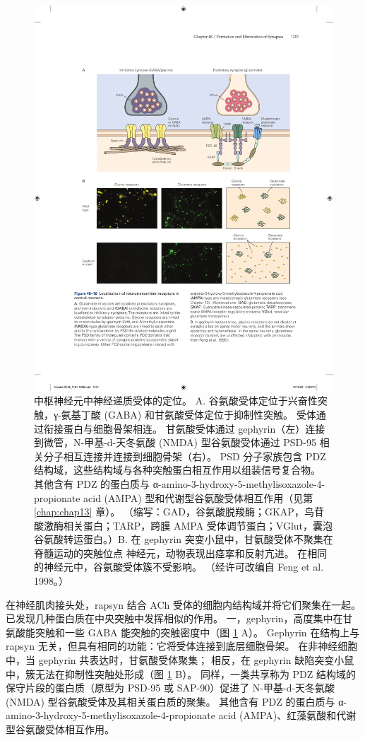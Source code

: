 \begin{figure}[htbp]
	\centering
	\includegraphics[width=0.8\linewidth]{chap48/fig_48_16}
	\caption{中枢神经元中神经递质受体的定位。 A. 谷氨酸受体定位于兴奋性突触，γ-氨基丁酸 (GABA) 和甘氨酸受体定位于抑制性突触。 受体通过衔接蛋白与细胞骨架相连。 甘氨酸受体通过 gephyrin（左）连接到微管，N-甲基-d-天冬氨酸 (NMDA) 型谷氨酸受体通过 PSD-95 相关分子相互连接并连接到细胞骨架（右）。 PSD 分子家族包含 PDZ 结构域，这些结构域与各种突触蛋白相互作用以组装信号复合物。 其他含有 PDZ 的蛋白质与 α-amino-3-hydroxy-5-methylisoxazole-4-propionate acid (AMPA) 型和代谢型谷氨酸受体相互作用（见第 \ref{chap:chap13} 章）。 （缩写：GAD，谷氨酸脱羧酶；GKAP，鸟苷酸激酶相关蛋白；TARP，跨膜 AMPA 受体调节蛋白；VGlut，囊泡谷氨酸转运蛋白。）B. 在 gephyrin 突变小鼠中，甘氨酸受体不聚集在脊髓运动的突触位点 神经元，动物表现出痉挛和反射亢进。 在相同的神经元中，谷氨酸受体簇不受影响。 （经许可改编自 Feng et al. 1998。）}
	\label{fig:48_16}
\end{figure}

在神经肌肉接头处，rapsyn 结合 ACh 受体的细胞内结构域并将它们聚集在一起。 已发现几种蛋白质在中央突触中发挥相似的作用。 一，gephyrin，高度集中在甘氨酸能突触和一些 GABA 能突触的突触密度中（图 \ref{fig:48_16} A）。 Gephyrin 在结构上与 rapsyn 无关，但具有相同的功能：它将受体连接到底层细胞骨架。 在非神经细胞中，当 gephyrin 共表达时，甘氨酸受体聚集； 相反，在 gephyrin 缺陷突变小鼠中，簇无法在抑制性突触处形成（图 \ref{fig:48_16} B）。 同样，一类共享称为 PDZ 结构域的保守片段的蛋白质（原型为 PSD-95 或 SAP-90）促进了 N-甲基-d-天冬氨酸 (NMDA) 型谷氨酸受体及其相关蛋白质的聚集。 其他含有 PDZ 的蛋白质与 α-amino-3-hydroxy-5-methylisoxazole-4-propionate acid (AMPA)、红藻氨酸和代谢型谷氨酸受体相互作用。


